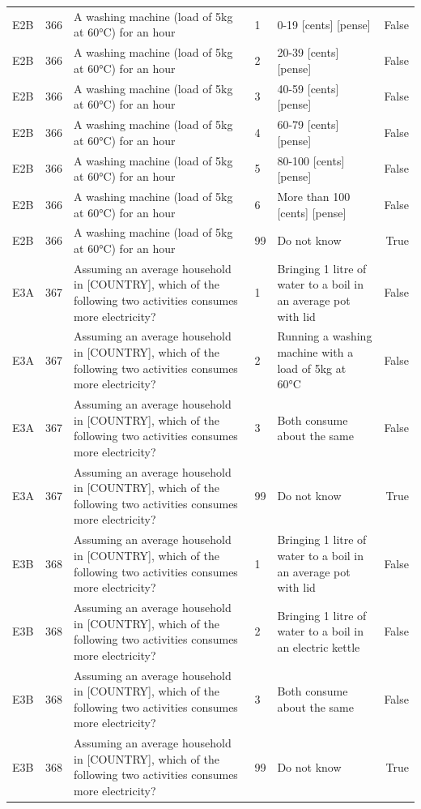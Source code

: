\begin{tabular}{lrlllr}
E2B & 366 & A washing machine (load of 5kg at 60°C) for an hour & 1 & 0-19 [cents] [pense] & False \\
E2B & 366 & A washing machine (load of 5kg at 60°C) for an hour & 2 & 20-39 [cents] [pense] & False \\
E2B & 366 & A washing machine (load of 5kg at 60°C) for an hour & 3 & 40-59 [cents] [pense] & False \\
E2B & 366 & A washing machine (load of 5kg at 60°C) for an hour & 4 & 60-79 [cents] [pense] & False \\
E2B & 366 & A washing machine (load of 5kg at 60°C) for an hour & 5 & 80-100 [cents] [pense] & False \\
E2B & 366 & A washing machine (load of 5kg at 60°C) for an hour & 6 & More than 100 [cents] [pense] & False \\
E2B & 366 & A washing machine (load of 5kg at 60°C) for an hour & 99 & Do not know & True \\
E3A & 367 & Assuming an average household in [COUNTRY], which of the following two activities consumes more electricity? & 1 & Bringing 1 litre of water to a boil in an average pot with lid & False \\
E3A & 367 & Assuming an average household in [COUNTRY], which of the following two activities consumes more electricity? & 2 & Running a washing machine with a load of 5kg at 60°C & False \\
E3A & 367 & Assuming an average household in [COUNTRY], which of the following two activities consumes more electricity? & 3 & Both consume about the same & False \\
E3A & 367 & Assuming an average household in [COUNTRY], which of the following two activities consumes more electricity? & 99 & Do not know & True \\
E3B & 368 & Assuming an average household in [COUNTRY], which of the following two activities consumes more electricity? & 1 & Bringing 1 litre of water to a boil in an average pot with lid & False \\
E3B & 368 & Assuming an average household in [COUNTRY], which of the following two activities consumes more electricity? & 2 & Bringing 1 litre of water to a boil in an electric kettle & False \\
E3B & 368 & Assuming an average household in [COUNTRY], which of the following two activities consumes more electricity? & 3 & Both consume about the same & False \\
E3B & 368 & Assuming an average household in [COUNTRY], which of the following two activities consumes more electricity? & 99 & Do not know & True \\

\end{tabular}
